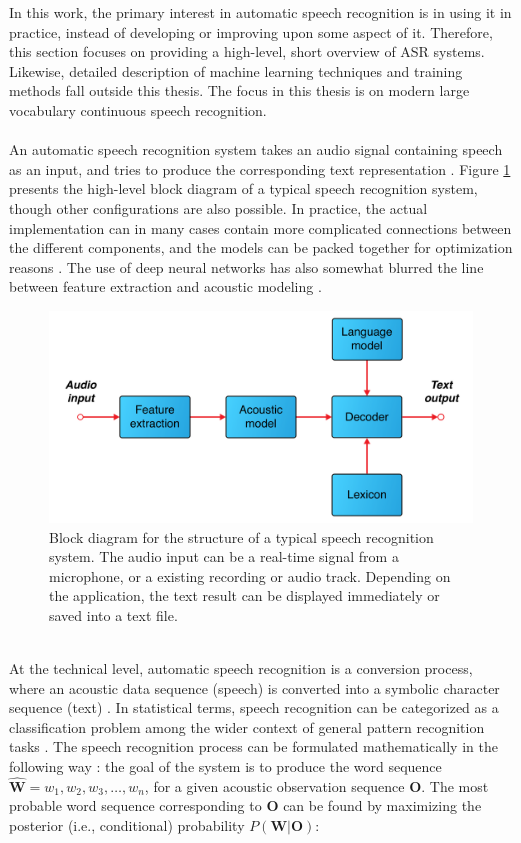 \documentclass[english, 12pt, a4paper, pdftex, elec, utf8]{aaltothesis}
\begin{document}
In this work, the primary interest in automatic speech recognition is in using it in practice, instead of developing or improving upon some aspect of it. Therefore, this section focuses on providing a high-level, short overview of ASR systems. Likewise, detailed description of machine learning techniques and training methods fall outside this thesis. The focus in this thesis is on modern large vocabulary continuous speech recognition. \\\\ An automatic speech recognition system takes an audio signal containing speech as an input, and tries to produce the corresponding text representation \cite{huang2001spoken, li2014overview}. Figure \ref{fig:asr} presents the high-level block diagram of a typical speech recognition system, though other configurations are also possible. In practice, the actual implementation can in many cases contain more complicated connections between the different components, and the models can be packed together for optimization reasons \cite{yu2014automatic, kallasjoki2016}. The use of deep neural networks has also somewhat blurred the line between feature extraction and acoustic modeling \cite{hinton2012deep, kallasjoki2016}. \\
\begin{figure}[h]
	\centering 
	\includegraphics[trim={1.8cm 0cm 1.8cm 0cm}, clip, width=\textwidth]{ASR.pdf}
	\caption{Block diagram for the structure of a typical speech recognition system. The audio input can be a real-time signal from a microphone, or a existing recording or audio track. Depending on the application, the text result can be displayed immediately or saved into a text file.}
	\label{fig:asr} 
\end{figure} \\
At the technical level, automatic speech recognition is a conversion process, where an acoustic data sequence (speech) is converted into a symbolic character sequence (text) \cite{yu2014automatic}. In statistical terms, speech recognition can be categorized as a classification problem among the wider context of general pattern recognition tasks \cite{huang2001spoken}. The speech recognition process can be formulated mathematically in the following way \cite{huang2001spoken, gales2008application, kallasjoki2016}: the goal of the system is to produce the word sequence $ \hat{\bm{W}} = w_1, w_2, w_3,\dots,w_n$, for a given acoustic observation sequence $\bm{O}$. The most probable word sequence corresponding to $\bm{O}$ can be found by maximizing the posterior (i.e., conditional) probability $P(\bm{W} | \bm{O})$:
\end{document}
